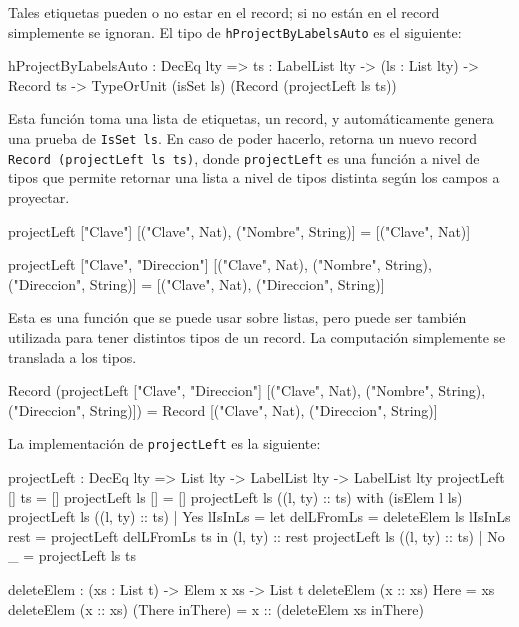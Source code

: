 Tales etiquetas pueden o no estar en el record; si no están en el record simplemente se ignoran. El tipo de \texttt{hProjectByLabelsAuto} es el siguiente:

\begin{code}
hProjectByLabelsAuto : DecEq lty => {ts : LabelList lty} ->
  (ls : List lty) -> Record ts ->
  TypeOrUnit (isSet ls) (Record (projectLeft ls ts))
\end{code}

Esta función toma una lista de etiquetas, un record, y automáticamente genera una prueba de \texttt{IsSet ls}. En caso de poder hacerlo, retorna un nuevo record \texttt{Record (projectLeft ls ts)}, donde \texttt{projectLeft} es una función a nivel de tipos que permite retornar una lista a nivel de tipos distinta según los campos a proyectar.

\begin{code}
projectLeft ["Clave"]
  [("Clave", Nat), ("Nombre", String)] =
  [("Clave", Nat)]

projectLeft ["Clave", "Direccion"]
  [("Clave", Nat), ("Nombre", String), ("Direccion", String)] =
  [("Clave", Nat), ("Direccion", String)]
\end{code}

Esta es una función que se puede usar sobre listas, pero puede ser también utilizada para tener distintos tipos de un record. La computación simplemente se translada a los tipos.

\begin{code}
Record (projectLeft ["Clave", "Direccion"]
  [("Clave", Nat), ("Nombre", String), ("Direccion", String)]) =
Record [("Clave", Nat), ("Direccion", String)]
\end{code}

La implementación de \texttt{projectLeft} es la siguiente:

\begin{code}
projectLeft : DecEq lty => List lty -> LabelList lty ->
  LabelList lty
projectLeft [] ts = []
projectLeft ls [] = []
projectLeft ls ((l, ty) :: ts) with (isElem l ls)
  projectLeft ls ((l, ty) :: ts) | Yes lIsInLs =
    let delLFromLs = deleteElem ls lIsInLs
      rest = projectLeft delLFromLs ts
    in (l, ty) :: rest
  projectLeft ls ((l, ty) :: ts) | No _ = projectLeft ls ts

deleteElem : (xs : List t) -> Elem x xs -> List t
deleteElem (x :: xs) Here = xs
deleteElem (x :: xs) (There inThere) =
  x :: (deleteElem xs inThere)
\end{code}

